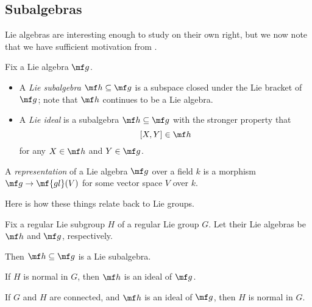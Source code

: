 \documentclass[../notes.tex]{subfiles}
\begin{document}
\subsection{Subalgebras}
Lie algebras are interesting enough to study on their own right, but we now note that we have sufficient motivation from .
\begin{defihelper}  
	Fix a Lie algebra $\mf g$.
	\begin{itemize}
		\item A \textit{Lie subalgebra} $\mf h\subseteq\mf g$ is a subspace closed under the Lie bracket of $\mf g$; note that $\mf h$ continues to be a Lie algebra.
		\item A \textit{Lie ideal} is a subalgebra $\mf h\subseteq\mf g$ with the stronger property that
		\[[X,Y]\in\mf h\]
		for any $X\in\mf h$ and $Y\in\mf g$.
	\end{itemize}
\end{defihelper}
\begin{definition}[representation]
	A \textit{representation} of a Lie algebra $\mf g$ over a field $k$ is a morphism $\mf g\to\mf{gl}(V)$ for some vector space $V$ over $k$.
\end{definition}
Here is how these things relate back to Lie groups.
\begin{proposition}
	Fix a regular Lie subgroup $H$ of a regular Lie group $G$. Let their Lie algebras be $\mf h$ and $\mf g$, respectively.
	\begin{listalph}
		\item Then $\mf h\subseteq\mf g$ is a Lie subalgebra.
		\item If $H$ is normal in $G$, then $\mf h$ is an ideal of $\mf g$.
		\item If $G$ and $H$ are connected, and $\mf h$ is an ideal of $\mf g$, then $H$ is normal in $G$.
	\end{listalph}
\end{proposition}
\end{document}
